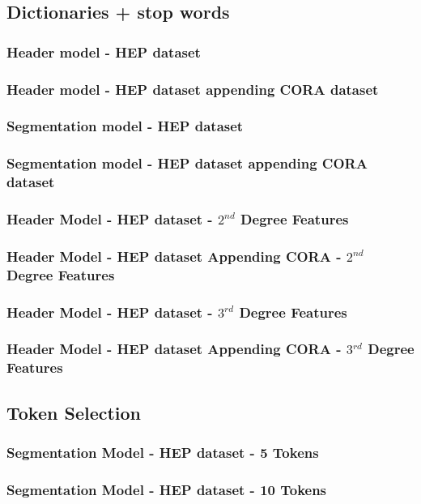 \documentclass[10pt, oneside]{scrartcl}   	%
\begin{document}
\subsection{Dictionaries + stop words}
\subsubsection{Header model - HEP dataset}
\subsubsection{Header model - HEP dataset appending CORA dataset}
\subsubsection{Segmentation model - HEP dataset}
\subsubsection{Segmentation model - HEP dataset appending CORA dataset}
\subsubsection{Header Model - HEP dataset - $2^{nd}$ Degree Features}
\subsubsection{Header Model - HEP dataset Appending CORA - $2^{nd}$ Degree Features}
\subsubsection{Header Model - HEP dataset - $3^{rd}$ Degree Features}
\subsubsection{Header Model - HEP dataset Appending CORA - $3^{rd}$ Degree Features}
\subsection{Token Selection}
\subsubsection{Segmentation Model - HEP dataset - 5 Tokens}
\subsubsection{Segmentation Model - HEP dataset - 10 Tokens}
\end{document}
